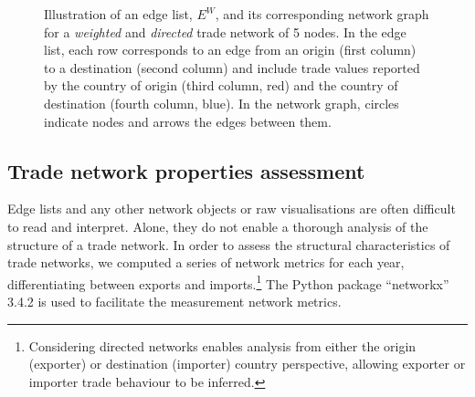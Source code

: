 \documentclass[
  authoryear,
  review,
  3p]{elsarticle}
\begin{document}
\begin{figure}[t]


\caption{\label{fig-edge-list-weighted}Illustration of an edge list,
\(E^W\), and its corresponding network graph for a \textit{weighted} and
\textit{directed} trade network of 5 nodes. In the edge list, each row
corresponds to an edge from an origin (first column) to a destination
(second column) and include trade values reported by the country of
origin (third column, red) and the country of destination (fourth
column, blue). In the network graph, circles indicate nodes and arrows
the edges between them.}

\end{figure}%

\subsection{Trade network properties
assessment}\label{trade-network-properties-assessment}

Edge lists and any other network objects or raw visualisations are often
difficult to read and interpret. Alone, they do not enable a thorough
analysis of the structure of a trade network. In order to assess the
structural characteristics of trade networks, we computed a series of
network metrics for each year, differentiating between exports and
imports.\footnote{Considering directed networks enables analysis from
  either the origin (exporter) or destination (importer) country
  perspective, allowing exporter or importer trade behaviour to be
  inferred.} The Python package ``networkx'' 3.4.2
\citep{hagberg_exploring_2008} is used to facilitate the measurement
network metrics.
\end{document}
